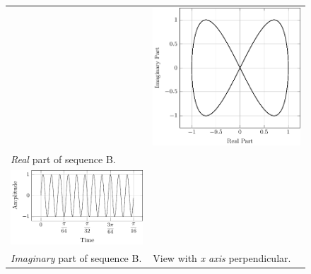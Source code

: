 \documentclass[../../course]{subfiles}
\begin{document}
\begin{figure} [H]
\begin{NiceTabularX} {\textwidth} {
            *{2}{>{\centering\arraybackslash}X}
        }
        &

         {
             {
                \includegraphics[height = \textheight] {tikzpics/plotFrontViewComplexB.pdf}
            }
        }

        \\

         {\emph{Real} part of sequence B.}
        \label{plt:realCmplxB}

        &
        \\

         {
             {
                \includegraphics[height = \textheight] {tikzpics/plotShortX2.pdf}
            }
        }

        &
        \\

         {\emph{Imaginary} part of sequence B.}
        \label{plt:imagCmplxB}

        &

         {View with \emph{x axis} perpendicular.}
        \label{plt:frontViewCmplxB}

        \\

    \end{NiceTabularX}

\end{figure}
\end{document}
